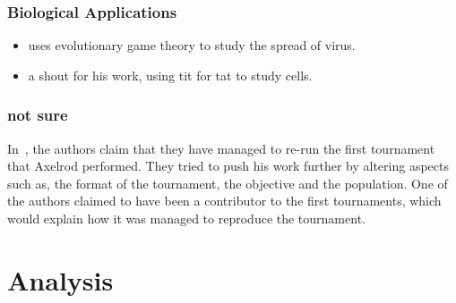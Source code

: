 \documentclass{article}
\begin{document}
\subsubsection{Biological Applications}
\begin{itemize}
    \item \cite{Turner1999} uses evolutionary game theory to study the spread of
    virus.
    \item \cite{Douglas2011} a shout for his work, using tit for tat to study cells.
\end{itemize}
\subsubsection{not sure}
In~\cite{Rapoport2015}, the authors claim that they have managed to 
re-run the first tournament that Axelrod performed. They tried to push his work
further by altering aspects such as, the format of the tournament, the objective
and the population. One of the authors claimed to have been a contributor
to the first tournaments, which would explain how it was managed to reproduce
the tournament.

\section{Analysis}\label{section:analysis}



\end{document}
